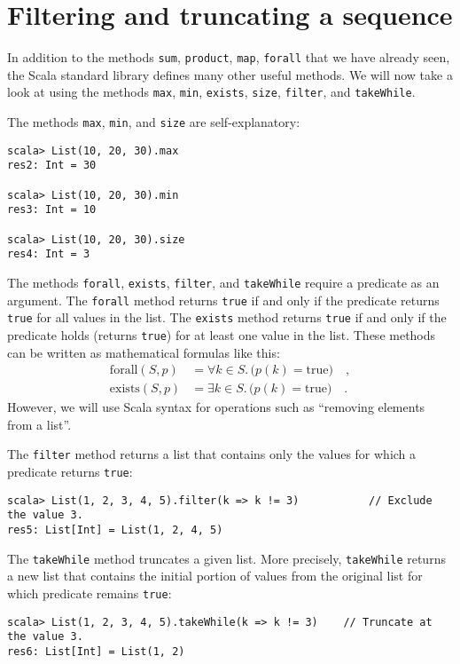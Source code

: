 \section{Filtering and truncating a sequence }

In addition to the methods \lstinline!sum!, \lstinline!product!,
\lstinline!map!, \texttt{}\lstinline!forall! that we have already
seen, the Scala standard library defines many other useful methods.
We will now take a look at using the methods \lstinline!max!, \lstinline!min!,
\lstinline!exists!, \lstinline!size!, \lstinline!filter!, and \lstinline!takeWhile!. 

The methods \lstinline!max!, \lstinline!min!, and \texttt{}\lstinline!size!
are self-explanatory:
\begin{lstlisting}
scala> List(10, 20, 30).max
res2: Int = 30

scala> List(10, 20, 30).min
res3: Int = 10

scala> List(10, 20, 30).size
res4: Int = 3
\end{lstlisting}

The methods \lstinline!forall!, \lstinline!exists!, \lstinline!filter!,
and \texttt{}\lstinline!takeWhile! require a predicate as an argument.
The \texttt{}\lstinline!forall! method returns \texttt{}\lstinline!true!
if and only if the predicate returns \lstinline!true! for all values
in the list. The \texttt{}\lstinline!exists! method returns \texttt{}\lstinline!true!
if and only if the predicate holds (returns \lstinline!true!) for
at least one value in the list. These methods can be written as mathematical
formulas like this:
\begin{align*}
\text{forall}\left(S,p\right) & =\forall k\in S.\,\big(p(k)=\text{true}\big)\quad,\\
\text{exists}\left(S,p\right) & =\exists k\in S.\,\big(p(k)=\text{true}\big)\quad.
\end{align*}
However, we will use Scala syntax for operations such as \textsf{``}removing
elements from a list\textsf{''}.

The \lstinline!filter! method returns a list that contains only the
values for which a predicate returns \texttt{}\lstinline!true!:

\begin{lstlisting}
scala> List(1, 2, 3, 4, 5).filter(k => k != 3)           // Exclude the value 3.
res5: List[Int] = List(1, 2, 4, 5)
\end{lstlisting}

The \texttt{}\lstinline!takeWhile! method truncates a given list.
More precisely, \lstinline!takeWhile! returns a new list that contains
the initial portion of values from the original list for which predicate
remains \lstinline!true!:
\begin{lstlisting}
scala> List(1, 2, 3, 4, 5).takeWhile(k => k != 3)    // Truncate at the value 3.
res6: List[Int] = List(1, 2)
\end{lstlisting}

